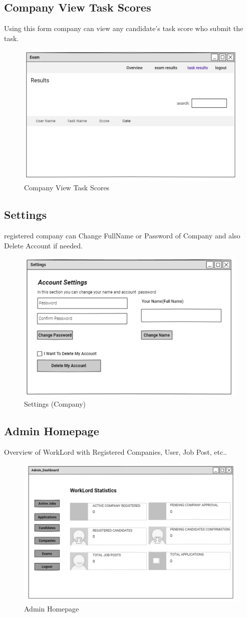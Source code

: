 \documentclass[a4paper,12pt]{report}
\begin{document}
\subsection {Company View Task Scores }
Using this form company can view any candidate's task score who submit the task.
\begin{figure}[bph]
	\centering
	\includegraphics[width=.7\linewidth]{img/company/ct2}
	\caption{Company View Task Scores }
\end{figure}
\subsection {Settings}
 registered company can Change FullName or Password of Company and also Delete Account if needed.
\begin{figure}[bph]
	\centering
	\includegraphics[width=.6\linewidth]{img/company/changecmpnypassword}
	\caption{Settings (Company)}
\end{figure}
\pagebreak
{}
\subsection {Admin Homepage}
Overview of WorkLord with Registered Companies, User, Job Post, etc.. 
\begin{figure}[bph]
	\centering
	\includegraphics[width=.7\linewidth]{img/admin/admindash}
	\caption{Admin Homepage}
\end{figure}
\end{document}
